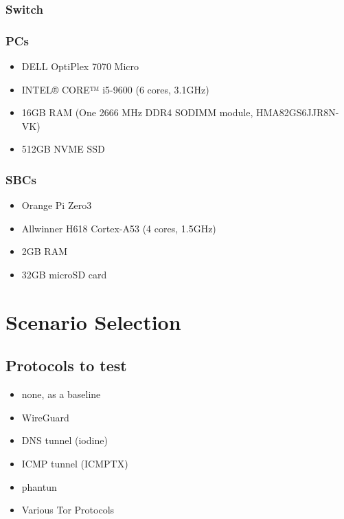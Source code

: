 \subsubsection{Switch}

\subsubsection{PCs}
\begin{itemize}
  \item DELL OptiPlex 7070 Micro
  \item INTEL® CORE™ i5-9600 (6 cores, 3.1GHz)
  \item 16GB RAM (One 2666 MHz DDR4 SODIMM module, HMA82GS6JJR8N-VK)
  \item 512GB NVME SSD
\end{itemize}

\subsubsection{SBCs}
\begin{itemize}
  \item Orange Pi Zero3
  \item Allwinner H618 Cortex-A53 (4 cores, 1.5GHz)
  \item 2GB RAM
  \item 32GB microSD card
\end{itemize}

\section{Scenario Selection}
\subsection{Protocols to test}
\begin{itemize}
  \item none, as a baseline
  \item WireGuard
  \item DNS tunnel (iodine)
  \item ICMP tunnel (ICMPTX)
  \item phantun
  \item Various Tor Protocols
\end{itemize}


